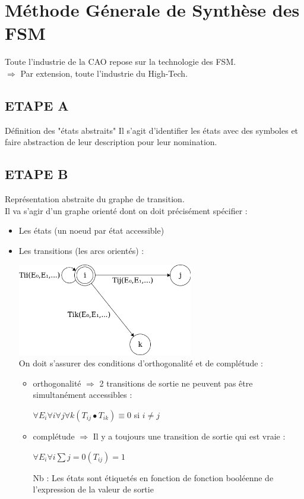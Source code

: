 \section{Méthode Génerale de Synthèse des FSM}
Toute l'industrie de la CAO repose sur la technologie des FSM. \\
$\Rightarrow$ Par extension, toute l'industrie du High-Tech.

\subsection{ETAPE A}
Définition des "états abstraits"
Il s'agit d'identifier les états avec des symboles et faire abstraction de leur
description pour leur nomination.

\subsection{ETAPE B}
Représentation abstraite du graphe de transition.\\
Il va s'agir d'un graphe orienté dont on doit précisément spécifier :
\begin{itemize}
  \item Les états (un noeud par état accessible)
  \item Les transitions (les arcs orientés) :
  \begin{center}
    \includegraphics[height=4cm]{cours1/pics/graph1.png}
    \\On doit s'assurer des conditions d'orthogonalité et de complétude :
    \begin{itemize}
      \item orthogonalité $\Rightarrow$ 2 transitions de sortie ne peuvent pas
      être simultanément accessibles :\\
      \begin{center}
        \(\forall E_i \forall i \forall j \forall k{(T_{ij} \bullet T_{ik})} \equiv 0\) si
        $i \ne j$
      \end{center}
      \item complétude $\Rightarrow$ Il y a toujours une transition de sortie
      qui est vraie : \\
      \begin{center}
        \(\forall E_i \forall i \sum{j=0}{(T_{ij})} = 1\)
      \end{center}
      Nb : Les états sont étiquetés en fonction de fonction booléenne de l'expression
      de la valeur de sortie
    \end{itemize}
  \end{center}
\end{itemize}

